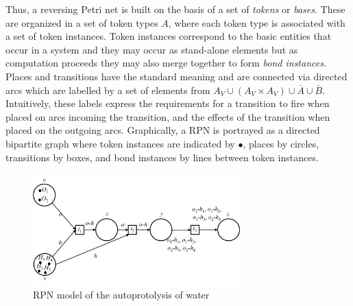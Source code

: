 \documentclass[runningheads]{llncs}
\begin{document}
Thus, a reversing Petri net is built on the basis of a set of \emph{tokens} or \emph{bases}. These
are organized in a set of token types $A$, where each token type is associated with a set of token instances.
Token instances correspond to the basic entities that occur in a system and they may occur as 
stand-alone elements but as computation proceeds they may also merge together to form \emph{bond 
	instances}. 
Places and transitions have the standard meaning and are connected
via directed arcs which are labelled by a set of elements from $A_V \cup (A_V \times A_V) \cup \overline{A}
\cup \overline{B}$.  Intuitively, these labels express the requirements for a transition
to fire when placed on arcs incoming the transition, and the effects of the transition when placed on the
outgoing arcs. 
Graphically, a RPN is portrayed as a directed bipartite graph where token instances are indicated by $\bullet$, places by
circles, transitions by boxes, and bond instances by lines between token instances. 
\begin{figure}[t]
	\centering
	\includegraphics[width=8cm]{model.png}
	\caption{RPN model of the autoprotolysis of water}
	\label{RPNmodel}
\end{figure}
\end{document}
